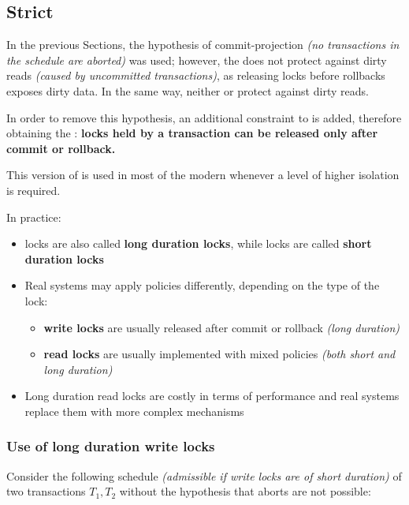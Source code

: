 \documentclass[english]{article}
\begin{document}
\subsection{Strict \TPL}

In the previous Sections, the hypothesis of commit-projection \textit{(no transactions in the schedule are aborted)} was used;
however, the \TPL does not protect against dirty reads \textit{(caused by uncommitted transactions)}, as releasing locks before rollbacks exposes dirty data.
In the same way, neither \VSR or \CSR protect against dirty reads.

In order to remove this hypothesis, an additional constraint to \TPL is added, therefore obtaining the \textbf{\STPL}:
\textbf{locks held by a transaction can be released only after commit or rollback.}

This version of \TPL is used in most of the modern \DBMS whenever a level of higher isolation is required.

\bigskip
In practice:
\begin{itemize}
  \item \STPL locks are also called \textbf{long duration locks}, while \TPL locks are called \textbf{short duration locks}
  \item Real systems may apply \TPL policies differently, depending on the type of the lock:
        \begin{itemize}
          \item \textbf{write locks} are usually released after commit or rollback \textit{(long duration)}
          \item \textbf{read locks} are usually implemented with mixed policies \textit{(both short and long duration)}
        \end{itemize}
  \item Long duration read locks are costly in terms of performance and real systems replace them with more complex mechanisms
\end{itemize}

\subsubsection{Use of long duration write locks}

Consider the following schedule \textit{(admissible if write locks are of short duration)} of two transactions \(T_1, T_2\) without the hypothesis that aborts are not possible:
\end{document}
